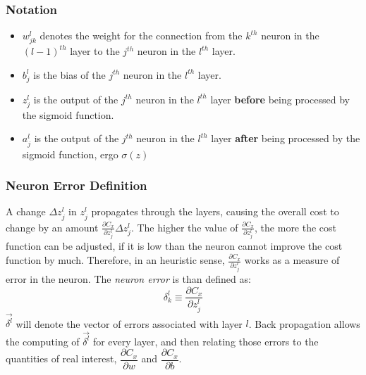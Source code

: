 \subsubsection{Notation}
\begin{itemize}
	\item $w_{jk}^{l}$ denotes the weight for the connection from the $k^{th}$ neuron in the $\left(l-1\right)^{th}$ layer to the $j^{th}$ neuron in the $l^{th}$ layer.
	\item $b_{j}^{l}$ is the bias of the $j^{th}$ neuron in the $l^{th}$ layer.
	\item $z_{j}^{l}$ is the output of the $j^{th}$ neuron in the $l^{th}$ layer \textbf{before} being processed by the sigmoid function. 
	\item $a_{j}^{l}$ is the output of the $j^{th}$ neuron in the $l^{th}$ layer \textbf{after} being processed by the sigmoid function, ergo $\sigma\left(z\right)$
\end{itemize}

\subsubsection{Neuron Error Definition}
A change $\Delta z_{j}^{l}$ in $z_{j}^{l}$ propagates through the layers, causing the overall cost to change by an amount  $\frac{\partial C_x}{\partial z_{j}^{l}}\Delta z_{j}^{l}$. The higher the value of $\frac{\partial C_x}{\partial z_{j}^{l}}$, the more the cost function can be adjusted, if it is low than the neuron cannot  improve the cost function by much. Therefore, in an heuristic sense,  $\frac{\partial C_x}{\partial z_{j}^{l}}$ works as a measure of error in the neuron. The \textit{neuron error} is than defined as:
\begin{equation}\label{NeuronError}
\delta_{k}^{l} \equiv \frac{\partial C_x}{\partial z_{j}^{l}}
\end{equation}
 $\vec{\delta^l}$ will denote the vector of errors associated with layer $l$. Back propagation allows the computing of $\vec{\delta^l}$ for every layer, and then relating those errors to the quantities of real interest, $\dfrac{\partial C_x}{\partial w}$ and $\dfrac{\partial C_x}{\partial b}$.
